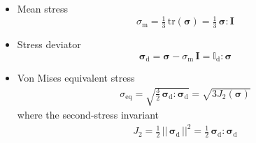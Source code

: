 \documentclass[times]{goose-article}
\begin{document}
\begin{itemize}
\item Mean stress
\begin{equation}
\sigma_\mathrm{m}
= \tfrac{1}{3} \, \mathrm{tr} ( \bm{\sigma} )
= \tfrac{1}{3} \, \bm{\sigma} : \bm{I}
\end{equation}
\item Stress deviator
\begin{equation}
  \bm{\sigma}_\mathrm{d}
  = \bm{\sigma} - \sigma_\mathrm{m} \, \bm{I}
  = \mathbb{I}_\mathrm{d} : \bm{\sigma}
\end{equation}
\item Von Mises equivalent stress
\begin{align}
\sigma_\mathrm{eq}
= \sqrt{ \tfrac{3}{2} \, \bm{\sigma}_\mathrm{d} : \bm{\sigma}_\mathrm{d} }
= \sqrt{ 3 J_2(\bm{\sigma}) }
\end{align}
where the second-stress invariant
\begin{align}
J_2 = \tfrac{1}{2} \, || \, \bm{\sigma}_\mathrm{d} \, ||^2
    = \tfrac{1}{2} \, \bm{\sigma}_\mathrm{d} : \bm{\sigma}_\mathrm{d}
\end{align}
\end{itemize}


\scriptsize



\end{document}
